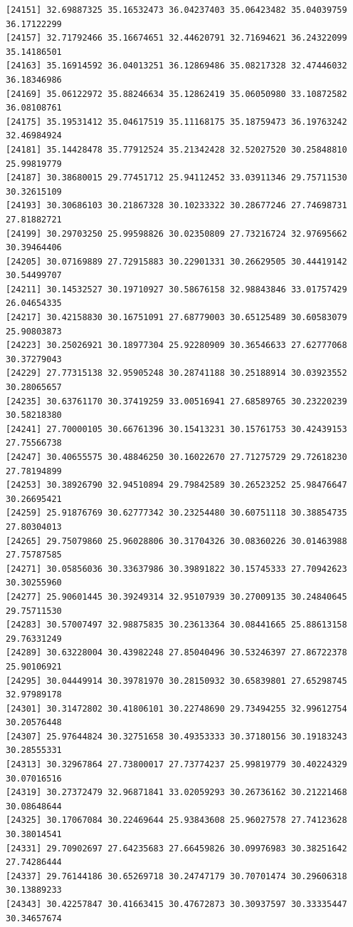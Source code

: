 \documentclass[
  letterpaper,
  DIV=11,
  numbers=noendperiod]{scrartcl}
\begin{document}
\begin{verbatim}
[24151] 32.69887325 35.16532473 36.04237403 35.06423482 35.04039759 36.17122299
[24157] 32.71792466 35.16674651 32.44620791 32.71694621 36.24322099 35.14186501
[24163] 35.16914592 36.04013251 36.12869486 35.08217328 32.47446032 36.18346986
[24169] 35.06122972 35.88246634 35.12862419 35.06050980 33.10872582 36.08108761
[24175] 35.19531412 35.04617519 35.11168175 35.18759473 36.19763242 32.46984924
[24181] 35.14428478 35.77912524 35.21342428 32.52027520 30.25848810 25.99819779
[24187] 30.38680015 29.77451712 25.94112452 33.03911346 29.75711530 30.32615109
[24193] 30.30686103 30.21867328 30.10233322 30.28677246 27.74698731 27.81882721
[24199] 30.29703250 25.99598826 30.02350809 27.73216724 32.97695662 30.39464406
[24205] 30.07169889 27.72915883 30.22901331 30.26629505 30.44419142 30.54499707
[24211] 30.14532527 30.19710927 30.58676158 32.98843846 33.01757429 26.04654335
[24217] 30.42158830 30.16751091 27.68779003 30.65125489 30.60583079 25.90803873
[24223] 30.25026921 30.18977304 25.92280909 30.36546633 27.62777068 30.37279043
[24229] 27.77315138 32.95905248 30.28741188 30.25188914 30.03923552 30.28065657
[24235] 30.63761170 30.37419259 33.00516941 27.68589765 30.23220239 30.58218380
[24241] 27.70000105 30.66761396 30.15413231 30.15761753 30.42439153 27.75566738
[24247] 30.40655575 30.48846250 30.16022670 27.71275729 29.72618230 27.78194899
[24253] 30.38926790 32.94510894 29.79842589 30.26523252 25.98476647 30.26695421
[24259] 25.91876769 30.62777342 30.23254480 30.60751118 30.38854735 27.80304013
[24265] 29.75079860 25.96028806 30.31704326 30.08360226 30.01463988 27.75787585
[24271] 30.05856036 30.33637986 30.39891822 30.15745333 27.70942623 30.30255960
[24277] 25.90601445 30.39249314 32.95107939 30.27009135 30.24840645 29.75711530
[24283] 30.57007497 32.98875835 30.23613364 30.08441665 25.88613158 29.76331249
[24289] 30.63228004 30.43982248 27.85040496 30.53246397 27.86722378 25.90106921
[24295] 30.04449914 30.39781970 30.28150932 30.65839801 27.65298745 32.97989178
[24301] 30.31472802 30.41806101 30.22748690 29.73494255 32.99612754 30.20576448
[24307] 25.97644824 30.32751658 30.49353333 30.37180156 30.19183243 30.28555331
[24313] 30.32967864 27.73800017 27.73774237 25.99819779 30.40224329 30.07016516
[24319] 30.27372479 32.96871841 33.02059293 30.26736162 30.21221468 30.08648644
[24325] 30.17067084 30.22469644 25.93843608 25.96027578 27.74123628 30.38014541
[24331] 29.70902697 27.64235683 27.66459826 30.09976983 30.38251642 27.74286444
[24337] 29.76144186 30.65269718 30.24747179 30.70701474 30.29606318 30.13889233
[24343] 30.42257847 30.41663415 30.47672873 30.30937597 30.33335447 30.34657674

\end{verbatim}
\end{document}

